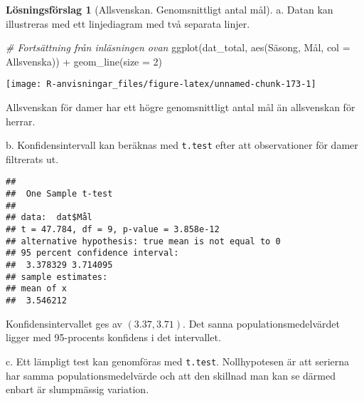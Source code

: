 \documentclass[
]{book}
\newenvironment{Shaded}{\begin{snugshade}}{\end{snugshade}}
\newcommand{\AttributeTok}[1]{\textcolor[rgb]{0.77,0.63,0.00}{#1}}
\newcommand{\CommentTok}[1]{\textcolor[rgb]{0.56,0.35,0.01}{\textit{#1}}}
\newcommand{\DecValTok}[1]{\textcolor[rgb]{0.00,0.00,0.81}{#1}}
\newcommand{\FunctionTok}[1]{\textcolor[rgb]{0.00,0.00,0.00}{#1}}
\newcommand{\NormalTok}[1]{#1}
\newcommand{\OtherTok}[1]{\textcolor[rgb]{0.56,0.35,0.01}{#1}}
\newcommand{\SpecialCharTok}[1]{\textcolor[rgb]{0.00,0.00,0.00}{#1}}
\newcommand{\StringTok}[1]{\textcolor[rgb]{0.31,0.60,0.02}{#1}}
\theoremstyle{definition}
\theoremstyle{definition}
\theoremstyle{definition}
\theoremstyle{definition}
\newtheorem{hypothesis}{Lösningsförslag}[chapter]
\theoremstyle{remark}
\begin{document}
\begin{hypothesis}[Allsvenskan. Genomsnittligt antal mål]
a. Datan kan illustreras med ett linjediagram med två separata linjer.

\begin{Shaded}
\begin{Highlighting}[]
\CommentTok{\# Fortsättning från inläsningen ovan}
\FunctionTok{ggplot}\NormalTok{(dat\_total, }\FunctionTok{aes}\NormalTok{(Säsong, Mål, }\AttributeTok{col =}\NormalTok{ Allsvenska)) }\SpecialCharTok{+}
  \FunctionTok{geom\_line}\NormalTok{(}\AttributeTok{size =} \DecValTok{2}\NormalTok{)}
\end{Highlighting}
\end{Shaded}

\begin{center}\texttt{[image: R-anvisningar\_files/figure-latex/unnamed-chunk-173-1]} \end{center}

Allsvenskan för damer har ett högre genomsnittligt antal mål än allsvenskan för herrar.

b. Konfidensintervall kan beräknas med \texttt{t.test} efter att observationer för damer filtrerats ut.

\begin{Shaded}
\end{Shaded}

\begin{verbatim}
## 
##  One Sample t-test
## 
## data:  dat$Mål
## t = 47.784, df = 9, p-value = 3.858e-12
## alternative hypothesis: true mean is not equal to 0
## 95 percent confidence interval:
##  3.378329 3.714095
## sample estimates:
## mean of x 
##  3.546212
\end{verbatim}

Konfidensintervallet ges av \((3.37, 3.71)\). Det sanna populationsmedelvärdet ligger med 95-procents konfidens i det intervallet.

c. Ett lämpligt test kan genomföras med \texttt{t.test}. Nollhypotesen är att serierna har samma populationsmedelvärde och att den skillnad man kan se därmed enbart är slumpmässig variation.


\end{hypothesis}
\end{document}
